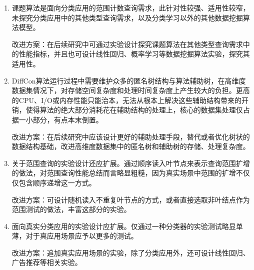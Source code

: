 \begin{enumerate}
	\item 课题算法是面向分类应用的范围计数查询需求，此针对性较强、适用性较窄，未探究分类应用中的其他类型查询需求，以及分类学习以外的其他数据挖掘算法模型。
	
	改进方案：在后续研究中可通过实验设计探究课题算法在其他类型查询需求中的性能指标，并且也可设计线性回归、概率学习等数据挖掘算法实验，探究其适用性。
	\item DiffCon算法运行过程中需要维护众多的匿名树结构与算法辅助树，在高维度数据集情况下，对存储空间复杂度和处理时间复杂度上产生较大的负担。更高的CPU、I/O或内存性能只能治本，无法从根本上解决这些辅助结构带来的开销，使得算法的绝大部分消耗花在辅助结构的处理上，核心的数据集处理仅占据一小部分，有点本末倒置。
	
	改进方案：在后续研究中应该设计更好的辅助处理手段，替代或者优化树状的数据结构基础，改进高维度数据集中的匿名树和辅助树的存储、处理复杂度。
	\item 关于范围查询的实验设计还应扩展。通过顺序读入叶节点来表示查询范围扩增的做法，对范围查询性能总结而言略显粗糙，因为真实场景中范围的扩增不仅仅包含顺序递增这一方式。
	
	改进方案：可设计随机读入不重复叶节点的方式，或者直接选取非叶结点作为范围测试的做法，丰富这部分的实验。
	\item 面向真实分类应用的实验设计应扩展。仅通过一种分类器的实验测试略显单薄，对于真应用场景应予以更多的测试。
	
	改进方案：追加真实应用场景的实验，除了分类应用外，还可设计线性回归、广告推荐等相关实验。
\end{enumerate}	